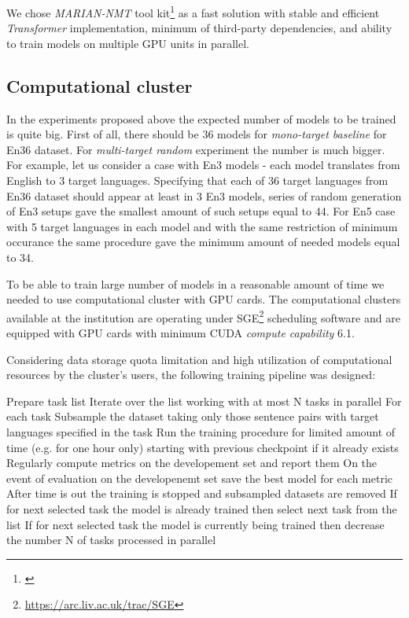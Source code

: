We chose \textit{MARIAN-NMT} tool kit\footnote{\cite{mariannmt}} as a fast solution
with stable and efficient \textit{Transformer} \cite{vaswani-2017-transformer} implementation,
minimum of third-party dependencies, and ability to train models on multiple GPU units in parallel.


\subsection{Computational cluster}

In the experiments proposed above the expected number of models to be trained is quite big.
First of all, there should be 36 models for \textit{mono-target baseline} for En\to{}36 dataset.
For \textit{multi-target random} experiment the number is much bigger.
For example, let us consider a case with En\to{}3 models - each model translates from English to 
3 target languages. Specifying that each of 36 target languages from En\to{}36 dataset
should appear at least in 3 En\to{}3 models, series of random generation of En\to{}3 setups gave
the smallest amount of such setups equal to 44. For En\to{}5 case with 5 target languages in each
model and with the same restriction of minimum occurance the same procedure gave the
minimum amount of needed models equal to 34.

To be able to train large number of models in a reasonable amount of time we needed to use
computational cluster with GPU cards.
The computational clusters available at the institution are operating under
SGE\footnote{\url{https://arc.liv.ac.uk/trac/SGE}} scheduling software and are equipped with
GPU cards with minimum CUDA \textit{compute capability} 6.1.

Considering data storage quota limitation and high utilization of computational resources by
the cluster's users, the following training pipeline was designed:

\begin{outline}
    \1 Prepare task list
    \1 Iterate over the list working with at most N tasks in parallel
    \1 For each task
        \2 Subsample the dataset taking only those sentence pairs with target languages
	   specified in the task
	\2 Run the training procedure for limited amount of time (e.g. for one hour only)
	   starting with previous checkpoint if it already exists
	\2 Regularly compute metrics on the developement set and report them
	\2 On the event of evaluation on the developenemt set save the best model for each metric
	\2 After time is out the training is stopped and subsampled datasets are removed
    \1 If for next selected task the model is already trained then select next task from the list
    \1 If for next selected task the model is currently being trained then decrease
       the number N of tasks processed in parallel
\end{outline}


